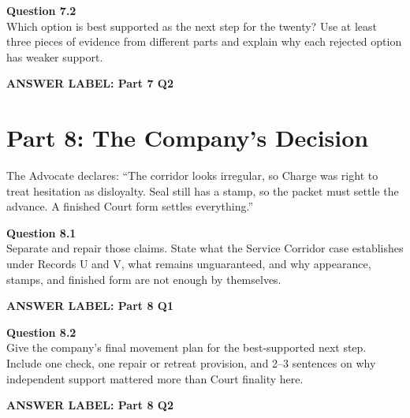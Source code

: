 \documentclass[12pt]{article}
\newcommand{\answerbox}[2]{\par\vspace{0.08em}\noindent\textbf{#1}\par\vspace{0.03em}\noindent\fbox{\begin{minipage}[t][#2]{\dimexpr\textwidth-2\fboxsep-2\fboxrule}\rule{\textwidth}{0pt}\vspace{#2}\end{minipage}}\par\vspace{0.16em}}
\begin{document}
\textbf{Question 7.2}\\[-0.15em]
Which option is best supported as the next step for the twenty? Use at least three pieces of evidence from different parts and explain why each rejected option has weaker support.
\answerbox{ANSWER LABEL: Part 7 Q2}{1.25in}

\newpage
\section*{Part 8: The Company's Decision}
The Advocate declares: ``The corridor looks irregular, so Charge was right to treat hesitation as disloyalty. Seal still has a stamp, so the packet must settle the advance. A finished Court form settles everything.''

\textbf{Question 8.1}\\[-0.15em]
Separate and repair those claims. State what the Service Corridor case establishes under Records U and V, what remains unguaranteed, and why appearance, stamps, and finished form are not enough by themselves.
\answerbox{ANSWER LABEL: Part 8 Q1}{1.95in}

\textbf{Question 8.2}\\[-0.15em]
Give the company's final movement plan for the best-supported next step. Include one check, one repair or retreat provision, and 2--3 sentences on why independent support mattered more than Court finality here.
\answerbox{ANSWER LABEL: Part 8 Q2}{1.95in}
\end{document}
